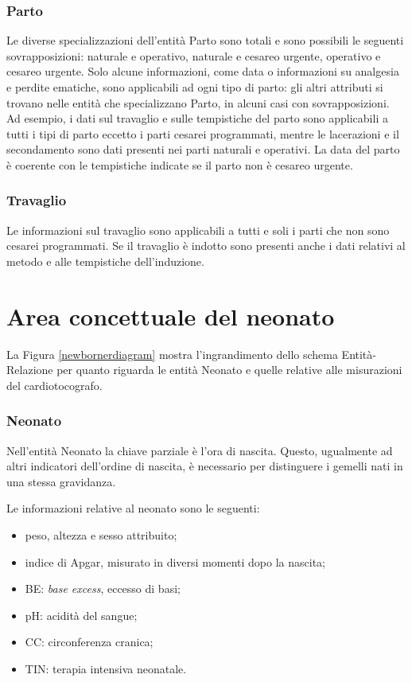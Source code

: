 \subsubsection{Parto}

Le diverse specializzazioni dell'entità Parto sono totali e sono possibili le seguenti sovrapposizioni: naturale e operativo, naturale e cesareo urgente, operativo e cesareo urgente.
Solo alcune informazioni, come data o informazioni su analgesia e perdite ematiche, sono applicabili ad ogni tipo di parto: gli altri attributi si trovano nelle entità che specializzano Parto, in alcuni casi con sovrapposizioni.
Ad esempio, i dati sul travaglio e sulle tempistiche del parto sono applicabili a tutti i tipi di parto eccetto i parti cesarei programmati, mentre le lacerazioni e il secondamento sono dati presenti nei parti naturali e operativi.
La data del parto è coerente con le tempistiche indicate se il parto non è cesareo urgente.

\subsubsection{Travaglio}

Le informazioni sul travaglio sono applicabili a tutti e soli i parti che non sono cesarei programmati.
Se il travaglio è indotto sono presenti anche i dati relativi al metodo e alle tempistiche dell'induzione.

\section{Area concettuale del neonato}
\label{newbornconceptual}

La Figura \ref{newbornerdiagram} mostra l'ingrandimento dello schema Entità-Relazione per quanto riguarda le entità Neonato e quelle relative alle misurazioni del cardiotocografo.

\subsubsection{Neonato}

Nell'entità Neonato la chiave parziale è l'ora di nascita.
Questo, ugualmente ad altri indicatori dell'ordine di nascita, è necessario per distinguere i gemelli nati in una stessa gravidanza.

Le informazioni relative al neonato sono le seguenti:
\begin{itemize}
\item peso, altezza e sesso attribuito;
\item indice di Apgar, misurato in diversi momenti dopo la nascita;
\item BE: \emph{base excess}, eccesso di basi;
\item pH: acidità del sangue;
\item CC: circonferenza cranica;
\item TIN: terapia intensiva neonatale.
\end{itemize}

